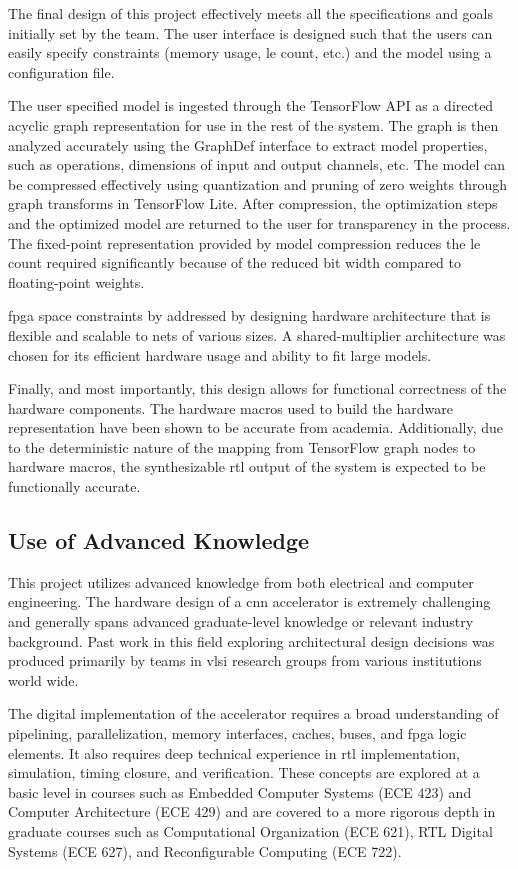 \documentclass{uw-ece-wkrpt}
\begin{document}
The final design of this project effectively meets all the specifications and goals initially set by the team. The user interface is designed such that the users can easily specify constraints (memory usage, \gls{le} count, etc.) and the model using a configuration file.

The user specified model is ingested through the TensorFlow API as a directed acyclic graph representation for use in the rest of the system. The graph is then analyzed accurately using the GraphDef interface to extract model properties, such as operations, dimensions of input and output channels, etc. The model can be compressed effectively using quantization and pruning of zero weights through graph transforms in TensorFlow Lite. After compression, the optimization steps and the optimized model are returned to the user for transparency in the process. The fixed-point representation provided by model compression reduces the \gls{le} count required significantly because of the reduced bit width compared to floating-point weights.

\gls{fpga} space constraints by addressed by designing hardware architecture that is flexible and scalable to nets of various sizes. A shared-multiplier architecture was chosen for its efficient hardware usage and ability to fit large models.

Finally, and most importantly, this design allows for functional correctness of the hardware components. The hardware macros used to build the hardware representation have been shown to be accurate from academia. Additionally, due to the deterministic nature of the mapping from TensorFlow graph nodes to hardware macros, the synthesizable \gls{rtl} output of the system is expected to be functionally accurate.

\subsection{Use of Advanced Knowledge}

This project utilizes advanced knowledge from both electrical and computer engineering. The hardware design of a \gls{cnn} accelerator is extremely challenging and generally spans advanced graduate-level knowledge or relevant industry background. Past work in this field exploring architectural design decisions was produced primarily by teams in \gls{vlsi} research groups from various institutions world wide.

The digital implementation of the accelerator requires a broad understanding of pipelining, parallelization, memory interfaces, caches, buses, and \gls{fpga} logic elements. It also requires deep technical experience in \gls{rtl} implementation, simulation, timing closure, and verification. These concepts are explored at a basic level in courses such as Embedded Computer Systems (ECE 423) and Computer Architecture (ECE 429) and are covered to a more rigorous depth in graduate courses such as Computational Organization (ECE 621), RTL Digital Systems (ECE 627), and Reconfigurable Computing (ECE 722).
\end{document}
